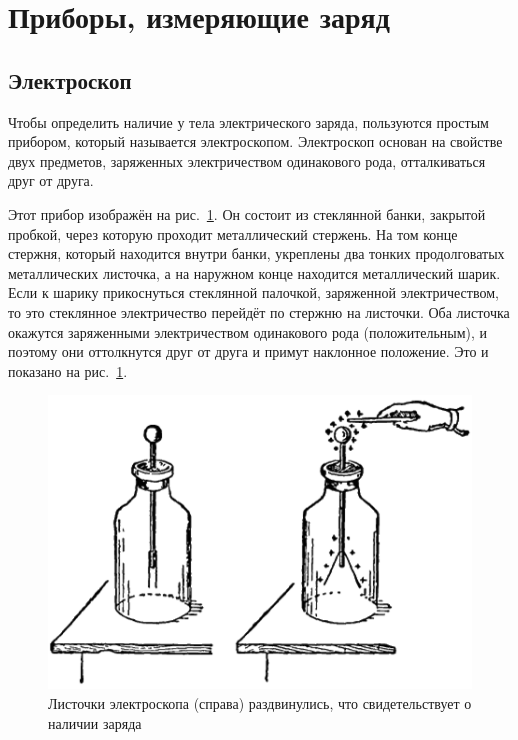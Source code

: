 \documentclass[pscyr,titlepage]{hedreport}
\begin{document}
  \maketitle
  \tableofcontents

  \section{Приборы, измеряющие заряд}
  \subsection{Электроскоп}
  Чтобы определить наличие у тела электрического заряда, пользуются простым
  прибором, который называется электроскопом. Электроскоп основан на свойстве
  двух предметов, заряженных электричеством одинакового рода, отталкиваться друг
  от друга.

  Этот прибор изображён на рис.~\ref{picElec}. Он состоит из стеклянной банки,
  закрытой пробкой, через которую проходит металлический стержень. На том конце
  стержня, который находится внутри банки, укреплены два тонких продолговатых
  металлических листочка, а на наружном конце находится металлический шарик.
  Если к шарику прикоснуться стеклянной палочкой, заряженной электричеством, то
  это стеклянное электричество перейдёт по стержню на листочки. Оба листочка
  окажутся заряженными электричеством одинакового рода (положительным), и
  поэтому они оттолкнутся друг от друга и примут наклонное положение. Это и
  показано на рис.~\ref{picElec}.

  \begin{figure}[ht]
    \center
    \includegraphics{sl_1_1}
    \parbox{.8\textwidth}{\caption{Листочки электроскопа (справа) раздвинулись,
      что свидетельствует о наличии заряда} \label{picElec}}
  \end{figure}
\end{document}
